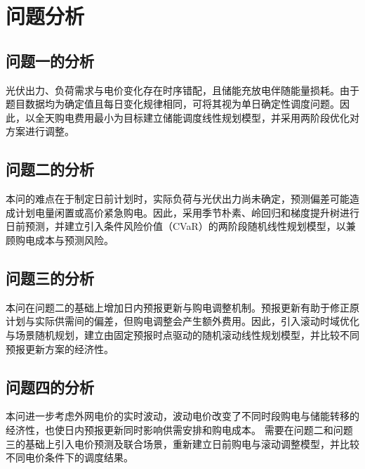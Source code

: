 \section{问题分析}

\subsection{问题一的分析}
光伏出力、负荷需求与电价变化存在时序错配，且储能充放电伴随能量损耗。由于题目数据均为确定值且每日变化规律相同，可将其视为单日确定性调度问题。因此，以全天购电费用最小为目标建立储能调度线性规划模型，并采用两阶段优化对方案进行调整。

\subsection{问题二的分析}
本问的难点在于制定日前计划时，实际负荷与光伏出力尚未确定，预测偏差可能造成计划电量闲置或高价紧急购电。因此，采用季节朴素、岭回归和梯度提升树进行日前预测，并建立引入条件风险价值（CVaR）的两阶段随机线性规划模型，以兼顾购电成本与预测风险。

\subsection{问题三的分析}
本问在问题二的基础上增加日内预报更新与购电调整机制。预报更新有助于修正原计划与实际供需间的偏差，但购电调整会产生额外费用。因此，引入滚动时域优化与场景随机规划，建立由固定预报时点驱动的随机滚动线性规划模型，并比较不同预报更新方案的经济性。

\subsection{问题四的分析}
本问进一步考虑外网电价的实时波动，波动电价改变了不同时段购电与储能转移的经济性，也使日内预报更新同时影响供需安排和购电成本。
需要在问题二和问题三的基础上引入电价预测及联合场景，重新建立日前购电与滚动调整模型，并比较不同电价条件下的调度结果。